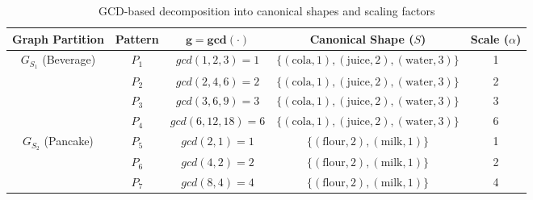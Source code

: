 \documentclass[10pt, twocolumn]{article}
\begin{document}
\begin{table}[t]
    \centering
    \begin{tabular}{|c|c|c|c|c|}
        \hline
        \textbf{Graph Partition}                                & \textbf{Pattern}          & $\mathbf{g = gcd(\cdot)}$ &
        \textbf{Canonical Shape ($S$)}                          & \textbf{Scale ($\alpha$)}                                                                          \\
        \hline
        $G_{S_1}$ (Beverage)                                    & $P_1$                     & $gcd(1,2,3)=1$            &
        $\{(\text{cola},1),(\text{juice},2),(\text{water},3)\}$ & 1                                                                                                  \\
                                                                & $P_2$                     & $gcd(2,4,6)=2$            &
        $\{(\text{cola},1),(\text{juice},2),(\text{water},3)\}$ & 2                                                                                                  \\
                                                                & $P_3$                     & $gcd(3,6,9)=3$            &
        $\{(\text{cola},1),(\text{juice},2),(\text{water},3)\}$ & 3                                                                                                  \\
                                                                & $P_4$                     & $gcd(6,12,18)=6$          &
        $\{(\text{cola},1),(\text{juice},2),(\text{water},3)\}$ & 6                                                                                                  \\
        \hline
        $G_{S_2}$ (Pancake)                                     & $P_5$                     & $gcd(2,1)=1$              &
        $\{(\text{flour},2),(\text{milk},1)\}$                  & 1                                                                                                  \\
                                                                & $P_6$                     & $gcd(4,2)=2$              & $\{(\text{flour},2),(\text{milk},1)\}$ & 2 \\
                                                                & $P_7$                     & $gcd(8,4)=4$              & $\{(\text{flour},2),(\text{milk},1)\}$ & 4 \\
        \hline
    \end{tabular}
    \caption{GCD-based decomposition into canonical shapes and scaling factors}
    \label{tab:gcd_decomposition}
\end{table}
\end{document}
